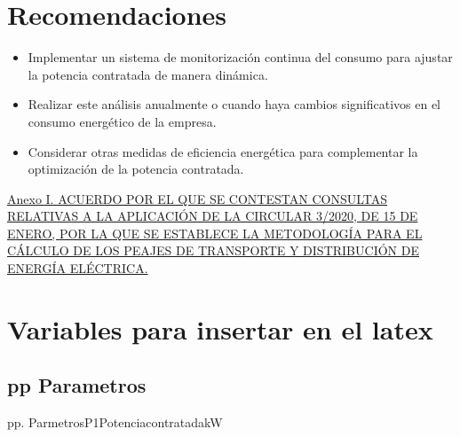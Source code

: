 \documentclass[a4paper,10pt,twocolumn]{article}
\begin{document}
\begin{Form}
\section{Recomendaciones}
\begin{itemize}
    \item Implementar un sistema de monitorización continua del consumo para ajustar la potencia contratada de manera dinámica.
    \item Realizar este análisis anualmente o cuando haya cambios significativos en el consumo energético de la empresa.
    \item Considerar otras medidas de eficiencia energética para complementar la optimización de la potencia contratada.
\end{itemize}
















\begin{thebibliography}{99}


\href{}
{}


\href{https://www.cnmc.es/sites/default/files/3416756_135.pdf}
{Anexo I. ACUERDO POR EL QUE SE CONTESTAN CONSULTAS RELATIVAS A LA
APLICACIÓN DE LA CIRCULAR 3/2020, DE 15 DE ENERO, POR LA QUE SE
ESTABLECE LA METODOLOGÍA PARA EL CÁLCULO DE LOS PEAJES DE
TRANSPORTE Y DISTRIBUCIÓN DE ENERGÍA ELÉCTRICA.}




\end{thebibliography}








\ifdefined\MostrarVariablesAlFinal
\newpage
\onecolumn


\newpage 
\section{Variables para insertar en el latex}
\newpage 
\subsection{pp Parametros}

pp. ParmetrosP1PotenciacontratadakW


\end{Form}
\end{document}
